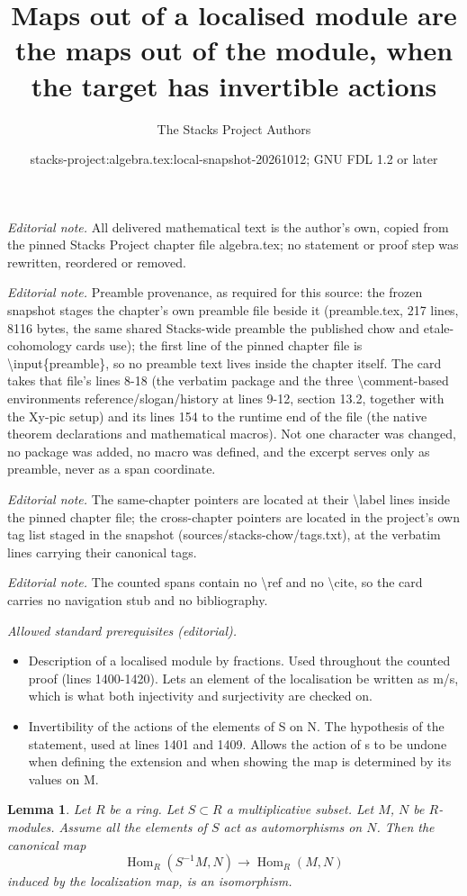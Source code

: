 \documentclass[10pt,a4paper]{amsart}
\title{Maps out of a localised module are the maps out of the module, when the target has invertible actions}
\author{The Stacks Project Authors}
\date{stacks-project:algebra.tex:local-snapshot-20261012; GNU FDL 1.2 or later}
\theoremstyle{plain}
\newtheorem{lemma}[subsection]{Lemma}
\theoremstyle{definition}
\theoremstyle{remark}
\numberwithin{equation}{subsection}
\def\Hom{\mathop{\mathrm{Hom}}\nolimits}
\begin{document}
\maketitle
\noindent\textit{Editorial note.} All delivered mathematical text is the author's own, copied from the pinned Stacks Project chapter file algebra.tex; no statement or proof step was rewritten, reordered or removed.\par\medskip
\noindent\textit{Editorial note.} Preamble provenance, as required for this source: the frozen snapshot stages the chapter's own preamble file beside it (preamble.tex, 217 lines, 8116 bytes, the same shared Stacks-wide preamble the published chow and etale-cohomology cards use); the first line of the pinned chapter file is \textbackslash{}input\{preamble\}, so no preamble text lives inside the chapter itself. The card takes that file's lines 8-18 (the verbatim package and the three \textbackslash{}comment-based environments reference/slogan/history at lines 9-12, section 13.2, together with the Xy-pic setup) and its lines 154 to the runtime end of the file (the native theorem declarations and mathematical macros). Not one character was changed, no package was added, no macro was defined, and the excerpt serves only as preamble, never as a span coordinate.\par\medskip
\noindent\textit{Editorial note.} The same-chapter pointers are located at their \textbackslash{}label lines inside the pinned chapter file; the cross-chapter pointers are located in the project's own tag list staged in the snapshot (sources/stacks-chow/tags.txt), at the verbatim lines carrying their canonical tags.\par\medskip
\noindent\textit{Editorial note.} The counted spans contain no \textbackslash{}ref and no \textbackslash{}cite, so the card carries no navigation stub and no bibliography.\par\medskip
\noindent\textit{Allowed standard prerequisites (editorial).}\begin{itemize}
\item Description of a localised module by fractions. Used throughout the counted proof (lines 1400-1420). Lets an element of the localisation be written as m/s, which is what both injectivity and surjectivity are checked on.
\item Invertibility of the actions of the elements of S on N. The hypothesis of the statement, used at lines 1401 and 1409. Allows the action of s to be undone when defining the extension and when showing the map is determined by its values on M.
\end{itemize}\medskip
\begin{lemma}
\label{lemma-universal-property-localization-module}
Let $R$ be a ring. Let $S \subset R$ a multiplicative subset. Let $M$, $N$
be $R$-modules. Assume all the elements of $S$ act as automorphisms on $N$.
Then the canonical map
$$
\Hom_R(S^{-1}M, N) \longrightarrow \Hom_R(M, N)
$$
induced by the localization map, is an isomorphism.
\end{lemma}
\end{document}
